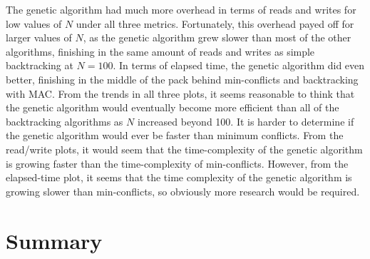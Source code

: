 \documentclass{article}
\begin{document}
		The genetic algorithm had much more overhead in terms of reads and writes for low values of $N$ under all three metrics. Fortunately, this overhead payed off for larger values of $N$, as the genetic algorithm grew slower than most of the other algorithms, finishing in the same amount of reads and writes as simple backtracking at $N=100$. In terms of elapsed time, the genetic algorithm did even better, finishing in the middle of the pack behind min-conflicts and backtracking with MAC. From the trends in all three plots, it seems reasonable to think that the genetic algorithm would eventually become more efficient than all of the backtracking algorithms as $N$ increased beyond 100. It is harder to determine if the genetic algorithm would ever be faster than minimum conflicts. From the read/write plots, it would seem that the time-complexity of the genetic algorithm is growing faster than the time-complexity of min-conflicts. However, from the elapsed-time plot, it seems that the time complexity of the genetic algorithm is growing slower than min-conflicts, so obviously more research would be required.
	
\section{Summary}

	




	
	
	
\end{document}
